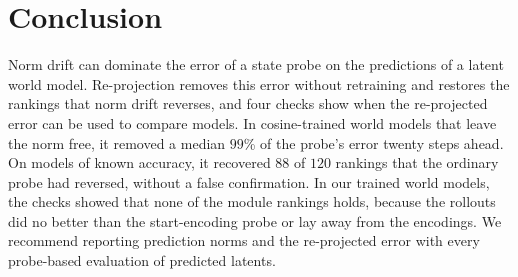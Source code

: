 \section{Conclusion}
\label{sec:conclusion}
Norm drift can dominate the error of a state probe on the predictions of a latent world model. Re-projection removes this error without retraining and restores the rankings that norm drift reverses, and four checks show when the re-projected error can be used to compare models. In cosine-trained world models that leave the norm free, it removed a median $99$\% of the probe's error twenty steps ahead. On models of known accuracy, it recovered $88$ of $120$ rankings that the ordinary probe had reversed, without a false confirmation. In our trained world models, the checks showed that none of the module rankings holds, because the rollouts did no better than the start-encoding probe or lay away from the encodings. We recommend reporting prediction norms and the re-projected error with every probe-based evaluation of predicted latents.
